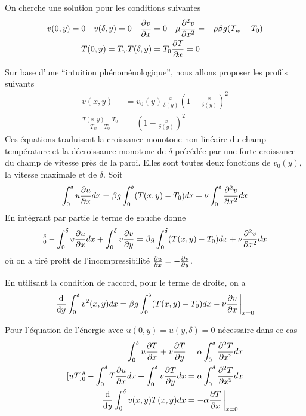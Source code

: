     On cherche une solution pour les conditions suivantes
    \begin{equation}
      \begin{aligned}
        v(0,y) = 0 \quad v(\delta,y) = 0 \quad \pdv{v}{x}(\delta, y) &= 0 \quad \mu\pdv[2]{v}{x}(0,y) = -\rho \beta g(T_w-T_0)\\
        T(0,y) = T_wT(\delta,y) &= T_0 \pdv{T}{x}(\delta,y) = 0
      \end{aligned}
    \end{equation}

    Sur base d'une ``intuition phénoménologique'', nous  allons proposer les profils suivants
    \begin{equation}
      \begin{aligned}
        v(x,y) &= v_0(y) \frac{x}{\delta(y)} \left(1-\frac{x}{\delta(y)}\right)^2\\
        \frac{T(x,y) - T_0}{T_w - T_0} &= \left(1-\frac{x}{\delta(y)}\right)^2
      \end{aligned}
    \end{equation}
    Ces équations traduisent la croissance monotone non linéaire du champ température et la décroissance monotone de $\delta$ précédée par une forte croissance du champ de vitesse près de la paroi. Elles sont toutes deux fonctions de $v_0(y)$, la vitesse maximale et de $\delta$. Soit
    \begin{equation}
      \int_0^\delta u \pdv{u}{x} dx = \beta g \int_0^\delta (T(x,y) - T_0) dx + \nu \int_0^\delta \pdv[2]{v}{x}dx
    \end{equation}
    En intégrant par partie le terme de gauche donne
    \begin{equation}
      [uv]_0^\delta - \int_0^\delta v\pdv{u}{x} dx + \int_0^\delta v\pdv{v}{y} = \beta g \int_0^\delta (T(x,y)-T_0)dx + \nu \pdv[2]{v}{x}dx
    \end{equation}
    où on a tiré profit de l'incompressibilité $\pdv{u}{x} = -\pdv{v}{y}$.

    En utilisant la condition de raccord, pour le terme de droite, on a
    \begin{equation}
      \dv{y}\int_0^\delta v^2(x,y)dx = \beta g \int_0^\delta (T(x,y) - T_0) dx - \nu \pdv{v}{x}\eval_{x=0}
    \end{equation}

    Pour l'équation de l'énergie avec $u(0,y) = u(y,\delta)=0$ nécessaire dans ce cas
    \begin{equation}
      \begin{aligned}
        \int_0^\delta u \pdv{T}{x} + v \pdv{T}{y} &= \alpha \int_0^\delta \pdv[2]{T}{x} dx\\
        [uT]_0^\delta - \int_0^\delta T\pdv{u}{x} dx + \int_0^\delta v\pdv{T}{y} dx &= \alpha \int_0^\delta \pdv[2]{T}{x}dx\\
        \dv{y} \int_0^{\delta} v(x,y) T(x,y) dx &= -\alpha \pdv{T}{x}\eval_{x=0}
      \end{aligned}
    \end{equation}

